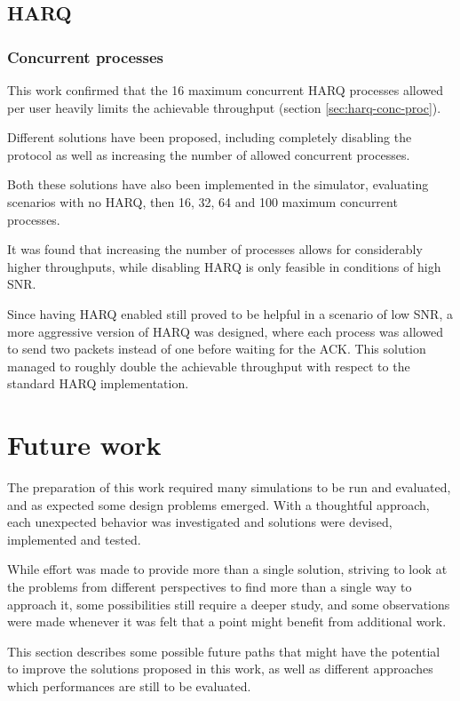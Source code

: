 \subsection{HARQ}
\subsubsection{Concurrent processes}
This work confirmed that the 16 maximum concurrent \ac{HARQ} processes allowed per user heavily limits the achievable throughput (section \ref{sec:harq-conc-proc}).

Different solutions have been proposed, including completely disabling the protocol as well as increasing the number of allowed concurrent processes.

Both these solutions have also been implemented in the simulator, evaluating scenarios with no \ac{HARQ}, then 16, 32, 64 and 100 maximum concurrent processes. 

It was found that increasing the number of processes allows for considerably higher throughputs, while disabling \ac{HARQ} is only feasible in conditions of high \ac{SNR}.

Since having \ac{HARQ} enabled still proved to be helpful in a scenario of low \ac{SNR}, a more aggressive version of \ac{HARQ} was designed, where each process was allowed to send two packets instead of one before waiting for the \ac{ACK}. This solution managed to roughly double the achievable throughput with respect to the standard \ac{HARQ} implementation.

\section{Future work}

The preparation of this work required many simulations to be run and evaluated, and as expected some design problems emerged. With a thoughtful approach, each unexpected behavior was investigated and solutions were devised, implemented and tested.

While effort was made to provide more than a single solution, striving to look at the problems from different perspectives to find more than a single way to approach it, some possibilities still require a deeper study, and some observations were made whenever it was felt that a point might benefit from additional work.

This section describes some possible future paths that might have the potential to improve the solutions proposed in this work, as well as different approaches which performances are still to be evaluated.

